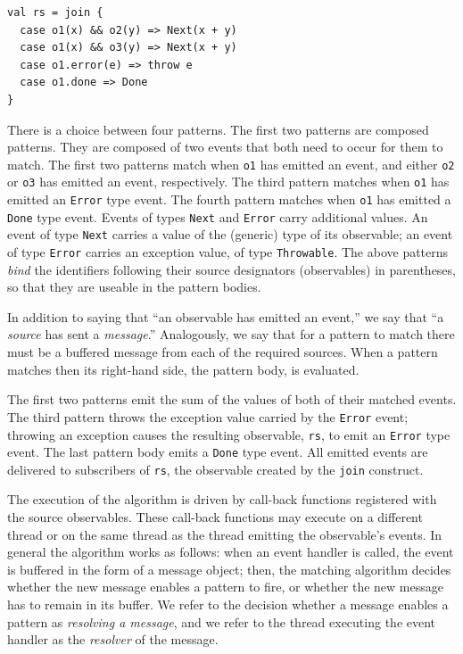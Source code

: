 \documentclass[runningheads]{llncs}
\begin{document}
\begin{sloppypar}
\begin{lstlisting}
val rs = join {
  case o1(x) && o2(y) => Next(x + y)
  case o1(x) && o3(y) => Next(x + y)
  case o1.error(e) => throw e
  case o1.done => Done
}
\end{lstlisting}

\noindent
There is a choice between four patterns. The first two patterns are composed
patterns. They are composed of two events that both need to occur for them to
match. The first two patterns match when \texttt{o1} has emitted an event, and
either \texttt{o2} or \texttt{o3} has emitted an event, respectively. The
third pattern matches when \texttt{o1} has emitted an \texttt{Error} type
event. The fourth pattern matches when \texttt{o1} has emitted a \texttt{Done}
type event. Events of types \texttt{Next} and \texttt{Error} carry additional
values. An event of type \texttt{Next} carries a value of the (generic) type
of its observable; an event of type \texttt{Error} carries an exception value,
of type \texttt{Throwable}. The above patterns {\em bind} the identifiers
following their source designators (observables) in parentheses, so that they
are useable in the pattern bodies.

In addition to saying that ``an observable has emitted an event,'' we say that
``a \emph{source} has sent a \emph{message}.'' Analogously, we say that for a
pattern to match there must be a buffered message from each of the required
sources. When a pattern matches then its right-hand side, the pattern body, is
evaluated.

The first two patterns emit the sum of the values of both of their matched
events. The third pattern throws the exception value carried by the
\texttt{Error} event; throwing an exception causes the resulting observable,
\verb|rs|, to emit an \texttt{Error} type event. The last pattern body emits a
\texttt{Done} type event. All emitted events are delivered to subscribers of
\texttt{rs}, the observable created by the \verb|join| construct.

The execution of the algorithm is driven by call-back functions registered
with the source observables. These call-back functions may execute on a
different thread or on the same thread as the thread emitting the observable's
events. In general the algorithm works as follows: when an event handler is
called, the event is buffered in the form of a message object; then, the
matching algorithm decides whether the new message enables a pattern to fire,
or whether the new message has to remain in its buffer. We refer to the
decision whether a message enables a pattern as \emph{resolving a message},
and we refer to the thread executing the event handler as the \emph{resolver}
of the message.


\end{sloppypar}
\end{document}

